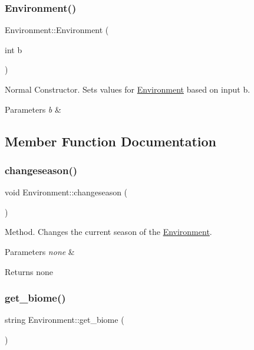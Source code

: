 \subsubsection{\texorpdfstring{Environment()}{Environment()}\hspace{0.1cm}{\footnotesize\ttfamily [2/2]}}
{\footnotesize\ttfamily Environment\+::\+Environment (\begin{DoxyParamCaption}\item[{int}]{b }\end{DoxyParamCaption})}

Normal Constructor. Sets values for \hyperlink{class_environment}{Environment} based on input b. 
\begin{DoxyParams}{Parameters}
{\em b} & \\
\hline
\end{DoxyParams}


\subsection{Member Function Documentation}
\mbox{\label{class_environment_ae12770ca6866e80c6b5c1ed6ce64088c}} 
\subsubsection{\texorpdfstring{changeseason()}{changeseason()}}
{\footnotesize\ttfamily void Environment\+::changeseason (\begin{DoxyParamCaption}{ }\end{DoxyParamCaption})}

Method. Changes the current season of the \hyperlink{class_environment}{Environment}. 
\begin{DoxyParams}{Parameters}
{\em none} & \\
\hline
\end{DoxyParams}
\begin{DoxyReturn}{Returns}
none 
\end{DoxyReturn}
\mbox{\label{class_environment_a85caf2f76cffed1ff5f26d9f419faa34}} 
\subsubsection{\texorpdfstring{get\+\_\+biome()}{get\_biome()}}
{\footnotesize\ttfamily string Environment\+::get\+\_\+biome (\begin{DoxyParamCaption}{ }\end{DoxyParamCaption})}

